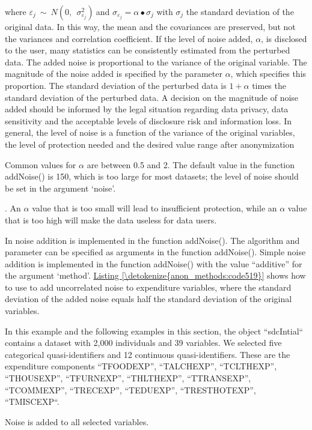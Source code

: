 \documentclass[letterpaper,10pt,english]{sphinxmanual}
\begin{document}
where
\(\varepsilon_{j}\ \sim\ N(0,\ \ \sigma_{\varepsilon_{j}}^{2})\ \)and
\(\sigma_{\varepsilon_{j}} = \alpha \bullet \sigma_{j}\) with
\(\sigma_{j}\) the standard deviation of the original data. In this
way, the mean and the covariances are preserved, but not the variances
and correlation coefficient. If the level of noise added,
\(\alpha\), is disclosed to the user, many statistics can be
consistently estimated from the perturbed data. The added noise is
proportional to the variance of the original variable. The magnitude of
the noise added is specified by the parameter \(\alpha\), which
specifies this proportion. The standard deviation of the perturbed data
is \(1 + \alpha\) times the standard deviation of the perturbed
data. A decision on the magnitude of noise added should be informed by
the legal situation regarding data privacy, data sensitivity and the
acceptable levels of disclosure risk and information loss. In general,
the level of noise is a function of the variance of the original
variables, the level of protection needed and the desired value range
after anonymization %
\begin{footnote}[18]\sphinxAtStartFootnote
Common values for \(\alpha\) are between 0.5 and 2. The default
value in the  function addNoise() is 150, which is too
large for most datasets; the level of noise should be set in the
argument ‘noise’.
%
\end{footnote}. An \(\alpha\) value that
is too small will lead to insufficient protection, while an
\(\alpha\) value that is too high will make the data useless for
data users.

In  noise addition is implemented in the function addNoise().
The algorithm and parameter can be specified as arguments in the
function addNoise(). Simple noise addition is implemented in the
function addNoise() with the value “additive” for the argument ‘method’.
\hyperref[\detokenize{anon_methods:code519}]{Listing \ref{\detokenize{anon_methods:code519}}} shows how to use  to add uncorrelated noise to
expenditure variables, where the standard deviation of the added noise
equals half the standard deviation of the original
variables. %
\begin{footnote}[19]\sphinxAtStartFootnote
In this example and the following examples in this section, the
 object “sdcIntial“ contains a dataset with 2,000
individuals and 39 variables. We selected five categorical
quasi-identifiers and 12 continuous quasi-identifiers. These are the
expenditure components “TFOODEXP”, “TALCHEXP”, “TCLTHEXP”,
“THOUSEXP”, “TFURNEXP”, “THLTHEXP”, “TTRANSEXP”, “TCOMMEXP”,
“TRECEXP”, “TEDUEXP”, “TRESTHOTEXP”, “TMISCEXP“.
%
\end{footnote} Noise is added to all selected
variables.
\end{document}
